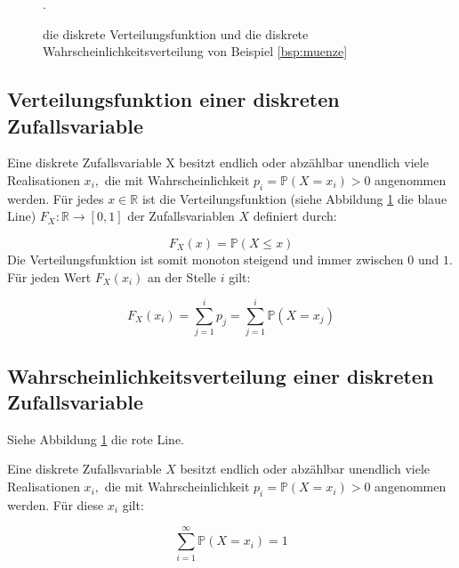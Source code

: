 {    \begin{figure}
    \centering
        \begin{tikzpicture}
            
        \end{tikzpicture}
        \caption{die diskrete Verteilungsfunktion und die diskrete Wahrscheinlichkeitsverteilung von Beispiel \ref{bsp:muenze}}.
        \label{fig:diskrete_verteilung_funktion}
    \end{figure}

    \subsection{Verteilungsfunktion einer diskreten Zufallsvariable}

    Eine diskrete Zufallsvariable X besitzt endlich oder abzählbar unendlich viele Realisationen
    $x_{i},$ die mit Wahrscheinlichkeit $p_{i}=\mathbb P\left(X=x_{i}\right)>0$ angenommen werden. 
    Für jedes $x\in\mathbb R$ ist die Verteilungsfunktion (siehe Abbildung \ref{fig:diskrete_verteilung_funktion} die blaue Line) $F_{X}:\mathbb R\rightarrow [0,1]$
    der Zufallsvariablen $X$ definiert durch:

    \[
    F_{X}\left(x\right)=\mathbb P(X\le x)
    \]
    Die Verteilungsfunktion ist somit monoton steigend und immer zwischen $0$ und $1$. Für jeden Wert
    $F_{X}\left(x_{i}\right)$ an der Stelle $i$ gilt:

    \[
        F_{X}\left(x_{i}\right)=\sum _{j=1}^{i}p_{j}=
        \sum_{j=1}^{i}{\mathbb P\left(X=x_{j}\right)}
    \]

    \subsection{Wahrscheinlichkeitsverteilung
        einer diskreten Zufallsvariable}
    Siehe Abbildung \ref{fig:diskrete_verteilung_funktion} die rote Line.

    Eine diskrete Zufallsvariable $X$ besitzt endlich oder abzählbar unendlich
    viele Realisationen $x_{i},$ die mit Wahrscheinlichkeit $p_{i}=\mathbb P\left(X=x_{i}\right)>0$
    angenommen werden. Für diese $x_{i}$ gilt: 

    \[\sum _{i=1}^{{\infty}}{\mathbb P\left(X=x_{i}\right)}=1\]

}
